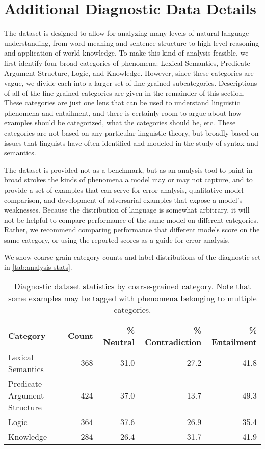 \documentclass{article} \usepackage{iclr2019_conference,times}
\begin{document}
\section{Additional Diagnostic Data Details}\label{sec:apdx_diagnostic}

The dataset is designed to allow for analyzing many levels of natural language understanding, from word meaning and sentence structure to high-level reasoning and application of world knowledge. To make this kind of analysis feasible, we first identify four broad categories of phenomena: Lexical Semantics, Predicate-Argument Structure, Logic, and Knowledge. However, since these categories are vague, we divide each into a larger set of fine-grained subcategories. Descriptions of all of the fine-grained categories are given in the remainder of this section. These categories are just one lens that can be used to understand linguistic phenomena and entailment, and there is certainly room to argue about how examples should be categorized, what the categories should be, etc. These categories are not based on any particular linguistic theory, but broadly based on issues that linguists have often identified and modeled in the study of syntax and semantics.
 
The dataset is provided not as a benchmark, but as an analysis tool to paint in broad strokes the kinds of phenomena a model may or may not capture, and to provide a set of examples that can serve for error analysis, qualitative model comparison, and development of adversarial examples that expose a model's weaknesses. Because the distribution of language is somewhat arbitrary, it will not be helpful to compare performance of the same model on different categories. Rather, we recommend comparing performance that different models score on the same category, or using the reported scores as a guide for error analysis.
 
We show coarse-grain category counts and label distributions of the diagnostic set in \autoref{tab:analysis-stats}.


\begin{table*}[t]
\centering \small
\begin{tabular}{lrrrr}
 \toprule
\textbf{Category} & \textbf{Count} & \textbf{\% Neutral} & \textbf{\% Contradiction} & \textbf{\% Entailment}  \\
\midrule
Lexical Semantics & 368 & 31.0 & 27.2 & 41.8 \\
Predicate-Argument Structure & 424 & 37.0 & 13.7 & 49.3 \\
Logic & 364 & 37.6 & 26.9 & 35.4 \\
Knowledge & 284 & 26.4 & 31.7 & 41.9 \\
\bottomrule
\end{tabular}
\caption{Diagnostic dataset statistics by coarse-grained category. Note that some examples may be tagged with phenomena belonging to multiple categories.
}
\label{tab:analysis-stats}
\end{table*}
\end{document}
